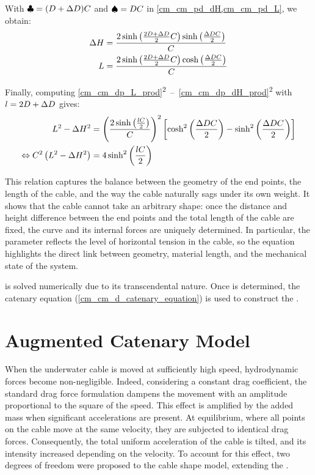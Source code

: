 With $\clubsuit = (D + \Delta D)C$ and $\spadesuit = DC$ in
\cref{cm_cm_pd_dH,cm_cm_pd_L}, we obtain:
\begin{align}
	\Delta H & = \frac{2\sinh{\left(\frac{2\ensuremath{D}+ \ensuremath{\Delta D}}{2}\ensuremath{C}\right)}\sinh{\left(\frac{\ensuremath{\Delta D}\ensuremath{C}}{2}\right)}}{C} \label{cm_cm_dp_dH_prod} \\
	L  & = \frac{2\sinh{\left(\frac{2\ensuremath{D}+ \ensuremath{\Delta D}}{2}\ensuremath{C}\right)}\cosh{\left(\frac{\ensuremath{\Delta D}\ensuremath{C}}{2}\right)}}{C} \label{cm_cm_dp_L_prod}
\end{align}

Finally, computing
\eqref{cm_cm_dp_L_prod}\textsuperscript{2}~--~\eqref{cm_cm_dp_dH_prod}\textsuperscript{2} with
$l = 2D + \Delta D$ gives:
\begin{align}
	L{}^2 - \Delta H{}^2                                         & = \left(\frac{2\sinh{\left(\frac{\ensuremath{l}{}\ensuremath{C}{}}{2}\right)}}{C{}}\right)^2 \left[\cosh^2{\left(\frac{\Delta D{}C{}}{2}\right)} - \sinh^2{\left(\frac{\Delta D{}C{}}{2}\right)}\right] \\
	\Leftrightarrow{} C{}^2\left(L{}^2 - \Delta H{}^2\right) & = 4\sinh^2{\left(\frac{l{}C{}}{2}\right)} \label{cm_cm_pd_minimization_function}
\end{align}

This relation captures the balance between the geometry of the end points, the length of the cable,
and the way the cable naturally sags under its own weight. It shows that the cable cannot take an
arbitrary shape: once the distance and height difference between the end points and the total
length of the cable are fixed, the curve and its internal forces are uniquely determined. In
particular, the parameter \catC{} reflects the level of horizontal tension in the cable, so the
equation highlights the direct link between geometry, material length, and the mechanical state of
the system.

 is solved numerically due to its transcendental nature. Once \catC{} is determined,
the catenary equation (\cref{cm_cm_d_catenary_equation}) is used to construct the \catenarymodel{}.

\section{Augmented Catenary Model}
\label{cm_augmented_catenary_model}

When the underwater cable is moved at sufficiently high speed, hydrodynamic forces become
non-negligible. Indeed, considering a constant drag coefficient, the standard drag force
formulation dampens the movement with an amplitude proportional to the square of the speed. This
effect is amplified by the added mass when significant accelerations are present. At equilibrium,
where all points on the cable move at the same velocity, they are subjected to identical drag
forces. Consequently, the total uniform acceleration of the cable is tilted, and its intensity
increased depending on the velocity. To account for this effect, two degrees of freedom were
proposed to the cable shape model, extending the \verticalmodel{}.

